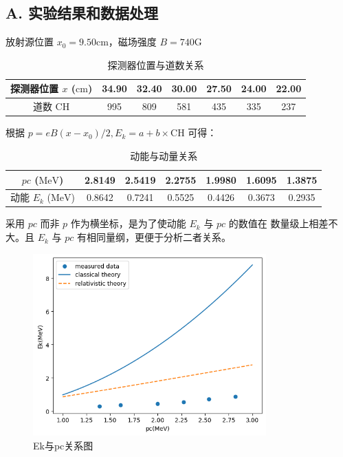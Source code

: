 \documentclass[aps,prl,preprint,groupedaddress]{revtex4-2}
\begin{document}
\subsection{A. 实验结果和数据处理}

放射源位置 $x_0=9.50\mathrm{cm}$，磁场强度 $B=740\mathrm{G}$

\begin{table}[H] %
	\centering %
	\caption{探测器位置与道数关系} %
	\begin{tabular}{|c|c|c|c|c|c|c|} %
	\hline %
	探测器位置 $x$ ($\mathrm{cm}$) &34.90  &32.40 &30.00 &27.50 &24.00 &22.00  \\ %
	\hline %
	道数 $\mathrm{CH }$ &995 &809 &581 &435 &335 &237\\ %
	\hline %
	\end{tabular}
\end{table}

根据 $p=eB(x-x_0)/2,E_k=a+b\times\mathrm{CH}$ 可得：

\begin{table}[H] %
	\centering %
	\caption{动能与动量关系} %
	\begin{tabular}{|c|c|c|c|c|c|c|} %
	\hline %
	$pc$ ($\mathrm{MeV}$) &2.8149  &2.5419 &2.2755 &1.9980 &1.6095 &1.3875  \\ %
	\hline %
	动能 $E_k$ ($\mathrm{MeV }$) &0.8642 &0.7241 &0.5525 &0.4426 &0.3673 &0.2935\\ %
	\hline %
	\end{tabular}
\end{table}

采用 $pc $ 而非 $p$ 作为横坐标，是为了使动能 $E_k$ 与 $pc$ 的数值在 数量级上相差不大。且  $E_k$ 与 $pc$ 有相同量纲，更便于分析二者关系。

\begin{figure}[H]
    \centering
    \includegraphics[width=0.8\textwidth]{img/1.png}
    \caption{Ek与pc关系图}
    \label{1}
\end{figure}
\end{document}
